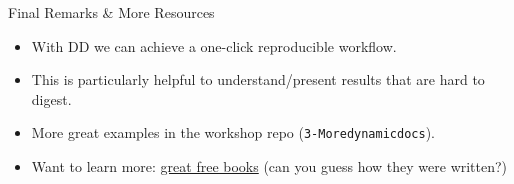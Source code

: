 \documentclass[ignorenonframetext,]{beamer}
\providecommand{\tightlist}{%
  \setlength{\itemsep}{0pt}\setlength{\parskip}{0pt}}
\begin{document}
\begin{frame}[fragile]{Final Remarks \& More Resources}

\begin{itemize}
\tightlist
\item
  With DD we can achieve a one-click reproducible workflow.
\item
  This is particularly helpful to understand/present results that are
  hard to digest.
\item
  More great examples in the workshop repo (\texttt{3-Moredynamicdocs}).
\item
  Want to learn more: \href{https://bookdown.org/}{great free books}
  (can you guess how they were written?)
\end{itemize}

\end{frame}
\end{document}
